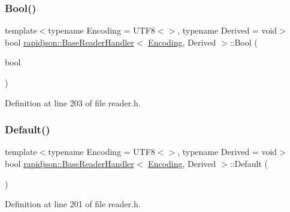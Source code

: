 \subsubsection{\texorpdfstring{Bool()}{Bool()}}
{\footnotesize\ttfamily template$<$typename Encoding = U\+T\+F8$<$$>$, typename Derived = void$>$ \\
bool \mbox{\hyperlink{structrapidjson_1_1_base_reader_handler}{rapidjson\+::\+Base\+Reader\+Handler}}$<$ \mbox{\hyperlink{classrapidjson_1_1_encoding}{Encoding}}, Derived $>$\+::Bool (\begin{DoxyParamCaption}\item[{bool}]{ }\end{DoxyParamCaption})}



Definition at line 203 of file reader.\+h.


\begin{DoxyCode}{0}

\end{DoxyCode}
\mbox{\label{structrapidjson_1_1_base_reader_handler_a050d1b4130a924d138f762d3c914a748}} 
\subsubsection{\texorpdfstring{Default()}{Default()}}
{\footnotesize\ttfamily template$<$typename Encoding = U\+T\+F8$<$$>$, typename Derived = void$>$ \\
bool \mbox{\hyperlink{structrapidjson_1_1_base_reader_handler}{rapidjson\+::\+Base\+Reader\+Handler}}$<$ \mbox{\hyperlink{classrapidjson_1_1_encoding}{Encoding}}, Derived $>$\+::Default (\begin{DoxyParamCaption}{ }\end{DoxyParamCaption})}



Definition at line 201 of file reader.\+h.


\begin{DoxyCode}{0}

\end{DoxyCode}
\mbox{\label{structrapidjson_1_1_base_reader_handler_a03e7d273b4d317b61a4ae56e0da9097a}} 
